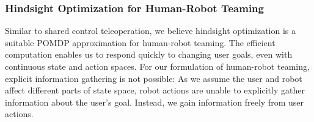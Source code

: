 \subsubsection*{Hindsight Optimization for Human-Robot Teaming}

Similar to shared control teleoperation, we believe hindsight optimization is a suitable POMDP approximation for human-robot teaming. The efficient computation enables us to respond quickly to changing user goals, even with continuous state and action spaces. For our formulation of human-robot teaming, explicit information gathering is not possible: As we assume the user and robot affect different parts of state space, robot actions are unable to explicitly gather information about the user's goal. Instead, we gain information freely from user actions.







